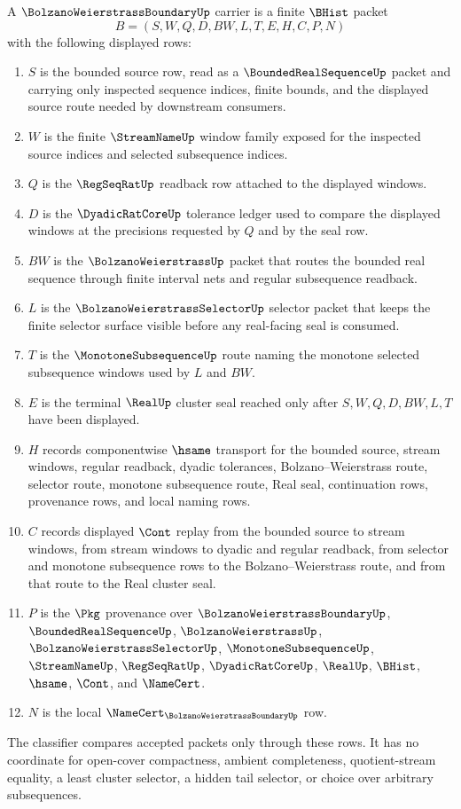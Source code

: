 \begin{definition}
\label{def:bolzano-weierstrass-boundary-carrier}
A $\BolzanoWeierstrassBoundaryUp$ carrier is a finite $\BHist$ packet
$$
B=(S,W,Q,D,BW,L,T,E,H,C,P,N)
$$
with the following displayed rows:
\begin{enumerate}
\item $S$ is the bounded source row, read as a $\BoundedRealSequenceUp$ packet and carrying only inspected sequence indices, finite bounds, and the displayed source route needed by downstream consumers.
\item $W$ is the finite $\StreamNameUp$ window family exposed for the inspected source indices and selected subsequence indices.
\item $Q$ is the $\RegSeqRatUp$ readback row attached to the displayed windows.
\item $D$ is the $\DyadicRatCoreUp$ tolerance ledger used to compare the displayed windows at the precisions requested by $Q$ and by the seal row.
\item $BW$ is the $\BolzanoWeierstrassUp$ packet that routes the bounded real sequence through finite interval nets and regular subsequence readback.
\item $L$ is the $\BolzanoWeierstrassSelectorUp$ selector packet that keeps the finite selector surface visible before any real-facing seal is consumed.
\item $T$ is the $\MonotoneSubsequenceUp$ route naming the monotone selected subsequence windows used by $L$ and $BW$.
\item $E$ is the terminal $\RealUp$ cluster seal reached only after $S,W,Q,D,BW,L,T$ have been displayed.
\item $H$ records componentwise $\hsame$ transport for the bounded source, stream windows, regular readback, dyadic tolerances, Bolzano--Weierstrass route, selector route, monotone subsequence route, Real seal, continuation rows, provenance rows, and local naming rows.
\item $C$ records displayed $\Cont$ replay from the bounded source to stream windows, from stream windows to dyadic and regular readback, from selector and monotone subsequence rows to the Bolzano--Weierstrass route, and from that route to the Real cluster seal.
\item $P$ is the $\Pkg$ provenance over $\BolzanoWeierstrassBoundaryUp$, $\BoundedRealSequenceUp$, $\BolzanoWeierstrassUp$, $\BolzanoWeierstrassSelectorUp$, $\MonotoneSubsequenceUp$, $\StreamNameUp$, $\RegSeqRatUp$, $\DyadicRatCoreUp$, $\RealUp$, $\BHist$, $\hsame$, $\Cont$, and $\NameCert$.
\item $N$ is the local $\NameCert_{\BolzanoWeierstrassBoundaryUp}$ row.
\end{enumerate}
The classifier compares accepted packets only through these rows. It has no coordinate for open-cover compactness, ambient completeness, quotient-stream equality, a least cluster selector, a hidden tail selector, or choice over arbitrary subsequences.
\end{definition}

